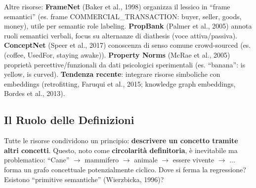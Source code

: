 \documentclass[12pt,a4paper]{article}
\begin{document}
\begin{resultbox}
\begin{center}
\end{center}
\end{resultbox}

Altre risorse: \textbf{FrameNet} (Baker et al., 1998) organizza il lessico in ``frame semantici'' (es. frame COMMERCIAL\_TRANSACTION: buyer, seller, goods, money), utile per semantic role labeling. \textbf{PropBank} (Palmer et al., 2005) annota ruoli semantici verbali, focus su alternanze di diathesis (voce attiva/passiva). \textbf{ConceptNet} (Speer et al., 2017) conoscenza di senso comune crowd-sourced (es. (coffee, UsedFor, staying awake)). \textbf{Property Norms} (McRae et al., 2005) proprietà percettive/funzionali da dati psicologici sperimentali (es. ``banana'': is yellow, is curved). \textbf{Tendenza recente}: integrare risorse simboliche con embeddings (retrofitting, Faruqui et al., 2015; knowledge graph embeddings, Bordes et al., 2013).

\subsection{Il Ruolo delle Definizioni}

Tutte le risorse condividono un principio: \textbf{descrivere un concetto tramite altri concetti}. Questo, noto come \textbf{circolarit\`a definitoria}, \`e inevitabile ma problematico: ``Cane'' $\to$ mammifero $\to$ animale $\to$ essere vivente $\to$ ... forma un grafo concettuale potenzialmente ciclico. Dove si ferma la regressione? Esistono ``primitive semantiche'' (Wierzbicka, 1996)?
\end{document}
